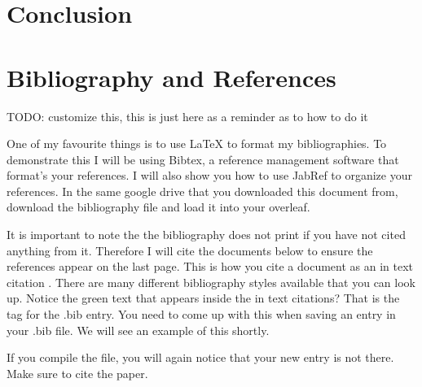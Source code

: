\documentclass[paper=a4, fontsize=11pt]{scrartcl}
\numberwithin{equation}{section}		%
\numberwithin{table}{section}				%
\begin{document}
\section{Conclusion}\label{sec: conlusion}

\section{Bibliography and References}\label{sec: bibliography}

TODO: customize this, this is just here as a reminder as to how to do it

One of my favourite things is to use \LaTeX{} to format my bibliographies. To demonstrate this I will be using Bibtex, a reference management software that format's your references. I will also show you how to use JabRef to organize your references. In the same google drive that you downloaded this document from, download the bibliography file and load it into your overleaf. 


It is important to note the the bibliography does not print if you have not cited anything from it. Therefore I will cite the documents below to ensure the references appear on the last page. This is how you cite a document as an in text citation \cite{LuTao2021Daco}. There are many different bibliography styles available that you can look up. Notice the green text that appears inside the in text citations? That is the tag for the .bib entry. You need to come up with this when saving an entry in your .bib file. We will see an example of this shortly. 


If you compile the file, you will again notice that your new entry is not there. Make sure to cite the paper. 

 
\clearpage
 




\end{document}
